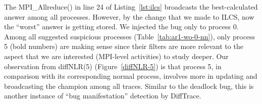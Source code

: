The MPI\_Allreduce() in line 24 of Listing~\ref{lst:ilcs} broadcasts the best-calculated answer among all processes.
%
However, by the change that we made to ILCS, now the ``worst'' answer is getting stored.
%
We injected the bug only to process 0.
%
Among all suggested suspicious processes (Table~\ref{tab:ar1-wo-0-nn}), only process 5 (bold numbers) are making sense since their filters are more relevant to the aspect that we are interested (MPI-level activities) to study deeper.
%
Our observation from diffNLR(5) (Figure~\ref{diffNLR-5}) is that process 5, in comparison with its corresponding normal process, involves more in updating and broadcasting the champion among all traces.
%
Similar to the deadlock bug, this is another instance of  ``bug manifestation'' detection by DiffTrace.






